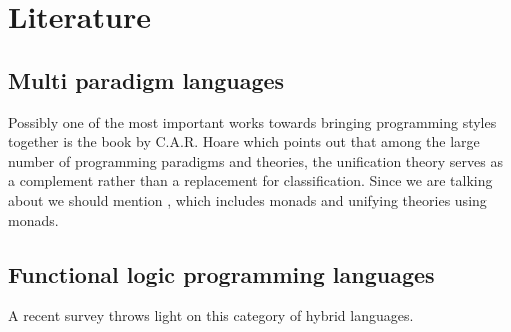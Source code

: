 \documentclass[thesis-solanki.tex]{subfiles}
\begin{document}


\section{Literature}
\subsection{Multi paradigm languages}
Possibly one of the most important works towards bringing programming styles together is the book
\cite{hoare1998unifying} by C.A.R.
Hoare which points out that among the large number of programming paradigms and theories, the unification theory
serves as a complement rather than a replacement for classification.
Since we are talking about  we should mention \cite{gibbons2013unifying}, which includes monads
and unifying theories using monads.
 

\subsection{Functional logic programming languages}

A recent survey \cite{hanus2007multi} throws light on this category of hybrid languages. 
\end{document}
